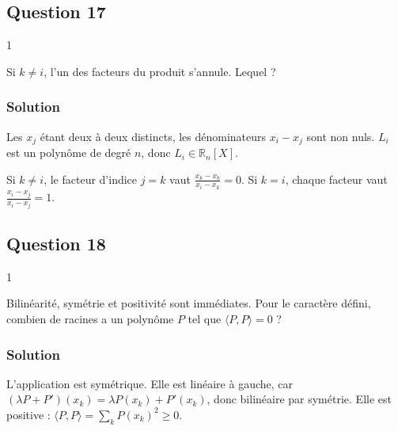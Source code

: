 \documentclass[11pt,a4paper]{article}
\newcommand{\equationajustee}[1]{%
  \sbox{\boiteequation}{$\displaystyle #1$}%
  \ifdim\wd\boiteequation>\linewidth
    \[\resizebox{\linewidth}{!}{\usebox{\boiteequation}}\]%
  \else
    \[#1\]%
  \fi}
\begin{document}
\hypertarget{question-17}{%
\subsection{Question 17}\label{question-17}}

\begin{indication}{1}

Si \(k\neq i\), l'un des facteurs du produit s'annule. Lequel ?

\end{indication}

\hypertarget{solution-16}{%
\subsubsection{Solution}\label{solution-16}}

Les \(x_j\) étant deux à deux distincts, les dénominateurs \(x_i-x_j\) sont non nuls. \(L_i\) est un polynôme de degré \(n\), donc \(L_i\in\mathbb R_n[X]\).

Si \(k\neq i\), le facteur d'indice \(j=k\) vaut \(\frac{x_k-x_k}{x_i-x_k}=0\). Si \(k=i\), chaque facteur vaut \(\frac{x_i-x_j}{x_i-x_j}=1\).
\equationajustee{\boxed{L_i(x_k)=\begin{cases}1&\text{si }k=i\\0&\text{sinon.}\end{cases}}}

\hypertarget{question-18}{%
\subsection{Question 18}\label{question-18}}

\begin{indication}{1}

Bilinéarité, symétrie et positivité sont immédiates. Pour le caractère défini, combien de racines a un polynôme \(P\) tel que \(\langle P,P\rangle=0\) ?

\end{indication}

\hypertarget{solution-17}{%
\subsubsection{Solution}\label{solution-17}}

L'application est symétrique. Elle est linéaire à gauche, car \((\lambda P+P')(x_k)=\lambda P(x_k)+P'(x_k)\), donc bilinéaire par symétrie. Elle est positive : \(\langle P,P\rangle=\sum_kP(x_k)^2\geqslant0\).
\end{document}
